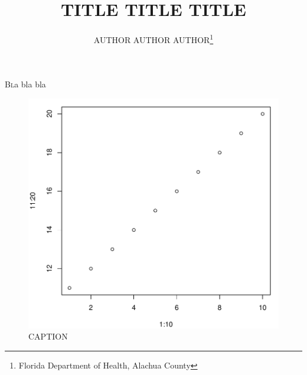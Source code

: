 \documentclass[twoside]{article}
\title{\vspace{-15mm}\fontsize{20pt}{10pt}\selectfont\textbf{TITLE TITLE TITLE}} %
\author{
\large
\textsc{AUTHOR AUTHOR AUTHOR}\thanks{Florida Department of Health, Alachua County}\\[2mm] %
\vspace{-5mm}
}
\date{}
\begin{document}


\maketitle %

\thispagestyle{fancy} %

\begin{abstract}
\noindent \lipsum[2]
\end{abstract}


\lettrine[nindent=0em,lines=3]{B}la bla bla \lipsum[1]


\begin{figure}[H]
\begin{center}
\includegraphics{articleTemplate-003}
\caption{CAPTION}
\end{center}
\end{figure}
\end{document}
